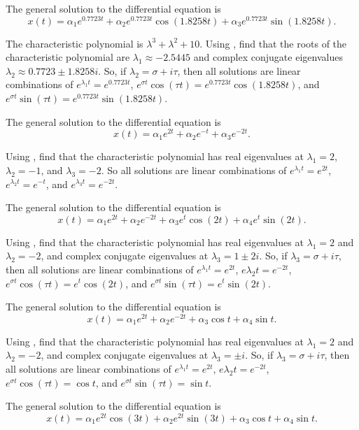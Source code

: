  \ans The general solution to the differential equation is
\[
x(t) = \alpha_1e^{0.7723t} + \alpha_2e^{0.7723t}\cos(1.8258t) +
\alpha_3e^{0.7723t}\sin(1.8258t).
\]

\soln The characteristic polynomial is $\lambda^3+\lambda^2+10$.  Using 
\Matlab, find that the roots of the characteristic polynomial are 
$\lambda_1 \approx  -2.5445$ and  complex conjugate eigenvalues 
$\lambda_2 \approx 0.7723 \pm 1.8258i$.  So, if $\lambda_2 = \sigma + i\tau$,
then all solutions are linear combinations of $e^{\lambda_1 t}=e^{0.7723t}$,
$e^{\sigma t}\cos(\tau t) = e^{0.7723t}\cos(1.8258t)$, and
$e^{\sigma t}\sin(\tau t) = e^{0.7723t}\sin(1.8258t)$.


 \ans The general solution to the differential equation is
\[
x(t) = \alpha_1e^{2t} + \alpha_2e^{-t} + \alpha_3e^{-2t}.
\]

\soln Using \Matlab, find that the characteristic polynomial has real
eigenvalues at $\lambda_1 = 2$, $\lambda_2 = -1$, and $\lambda_3 = -2$.  So
all solutions are linear combinations of $e^{\lambda_1 t} = e^{2t}$,
$e^{\lambda_2 t} = e^{-t}$, and $e^{\lambda_3 t} = e^{-2t}$.

 \ans The general solution to the differential equation is
\[
x(t) = \alpha_1e^{2t} + \alpha_2e^{-2t} + \alpha_3e^t\cos(2t) +
\alpha_4e^t\sin(2t).
\]

\soln Using \Matlab, find that the characteristic polynomial has real
eigenvalues at $\lambda_1 = 2$ and $\lambda_2 = -2$, and complex
conjugate eigenvalues at $\lambda_3 = 1 \pm 2i$.  So, if $\lambda_3 =
\sigma + i\tau$, then all solutions are linear combinations of
$e^{\lambda_1 t} = e^{2t}$, $e{\lambda_2 t} = e^{-2t}$,
$e^{\sigma t}\cos(\tau t) = e^t\cos(2t)$, and
$e^{\sigma t}\sin(\tau t) = e^t\sin(2t)$.

 \ans The general solution to the differential equation is
\[
x(t) = \alpha_1e^{2t} + \alpha_2e^{-2t} + \alpha_3\cos t +
\alpha_4\sin t.
\]

\soln Using \Matlab, find that the characteristic polynomial has real
eigenvalues at $\lambda_1 = 2$ and $\lambda_2 = -2$, and complex
conjugate eigenvalues at $\lambda_3 = \pm i$.  So, if $\lambda_3 =
\sigma + i\tau$, then all solutions are linear combinations of
$e^{\lambda_1 t} = e^{2t}$, $e{\lambda_2 t} = e^{-2t}$,
$e^{\sigma t}\cos(\tau t) = \cos t$, and $e^{\sigma t}\sin(\tau t) = \sin t$.

 \ans The general solution to the differential equation is
\[
x(t) = \alpha_1e^{2t}\cos(3t) + \alpha_2e^{2t}\sin(3t) +
\alpha_3\cos t + \alpha_4\sin t.
\]

